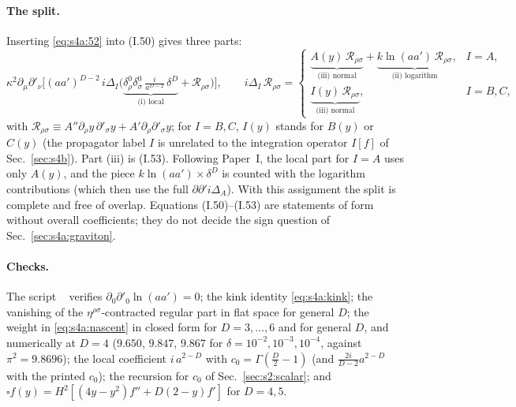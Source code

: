 \documentclass[aps,prd,onecolumn,10pt,nofootinbib,floatfix]{revtex4-2}
\newcommand{\PI}{Paper~I}
\newcommand{\eqI}[1]{(I.#1)}
\begin{document}
\paragraph*{The split.}
Inserting \eqref{eq:s4a:52} into \eqI{50} gives three parts:
\begin{equation}
\kappa^2\partial_\mu\partial'_\nu\Big[(aa')^{D-2}\,i\Delta_I\Big(\underbrace{\delta^0_\rho\delta^0_\sigma\,\tfrac{i}{a^{D-2}}\,\delta^D}_{\text{(i) local}}
+\mathcal R_{\rho\sigma}\Big)\Big],
\qquad
i\Delta_I\,\mathcal R_{\rho\sigma}=
\begin{cases}
\underbrace{A(y)\,\mathcal R_{\rho\sigma}}_{\text{(iii) normal}}+\underbrace{k\ln(aa')\,\mathcal R_{\rho\sigma}}_{\text{(ii) logarithm}}, & I=A,\\[2pt]
\underbrace{I(y)\,\mathcal R_{\rho\sigma}}_{\text{(iii) normal}}, & I=B,C,
\end{cases}
\label{eq:s4a:split}
\end{equation}
with $\mathcal R_{\rho\sigma}\equiv A''\partial_\rho y\,\partial'_\sigma y+A'\partial_\rho\partial'_\sigma y$; for $I=B,C$,
$I(y)$ stands for $B(y)$ or $C(y)$ (the propagator label $I$ is unrelated to the integration operator $I[f]$ of
Sec.~\ref{sec:s4b}). Part (iii) is \eqI{53}. Following \PI, the local part for $I=A$ uses only $A(y)$, and the piece
$k\ln(aa')\times\delta^D$ is counted with the logarithm contributions (which then use the full
$\partial\partial'i\Delta_A$). With this assignment the split is complete and free of overlap.
Equations \eqI{50}--\eqI{53} are statements of form without overall coefficients; they do not decide the sign
question of Sec.~\ref{sec:s4a:graviton}.

\paragraph*{Checks.}
The script ~\cite{ref:repo} verifies
$\partial_0\partial'_0\ln(aa')=0$; the kink identity \eqref{eq:s4a:kink}; the vanishing of the
$\eta^{\rho\sigma}$-contracted regular part in flat space for general $D$; the weight in
\eqref{eq:s4a:nascent} in closed form for $D=3,\dots,6$ and for general $D$, and numerically at $D=4$
($9.650$, $9.847$, $9.867$ for $\delta=10^{-2},10^{-3},10^{-4}$, against $\pi^2=9.8696$); the local
coefficient $i\,a^{2-D}$ with $c_0=\Gamma(\frac D2-1)$ (and $\frac{2i}{D-2}a^{2-D}$ with the printed
$c_0$); the recursion for $c_0$ of Sec.~\ref{sec:s2:scalar}; and $\square f(y)=H^2[(4y-y^2)f''+D(2-y)f']$ for $D=4,5$.
\end{document}
